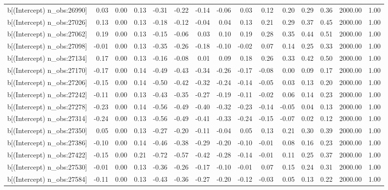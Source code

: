 \begin{table}[ht]
\begin{tabular}{rrrrrrrrrrrrrrr}
  b[(Intercept) n\_obs:26990] & 0.03 & 0.00 & 0.13 & -0.31 & -0.22 & -0.14 & -0.06 & 0.03 & 0.12 & 0.20 & 0.29 & 0.36 & 2000.00 & 1.00 \\ 
  b[(Intercept) n\_obs:27026] & 0.13 & 0.00 & 0.13 & -0.18 & -0.12 & -0.04 & 0.04 & 0.13 & 0.21 & 0.29 & 0.37 & 0.45 & 2000.00 & 1.00 \\ 
  b[(Intercept) n\_obs:27062] & 0.19 & 0.00 & 0.13 & -0.15 & -0.06 & 0.03 & 0.10 & 0.19 & 0.28 & 0.35 & 0.44 & 0.51 & 2000.00 & 1.00 \\ 
  b[(Intercept) n\_obs:27098] & -0.01 & 0.00 & 0.13 & -0.35 & -0.26 & -0.18 & -0.10 & -0.02 & 0.07 & 0.14 & 0.25 & 0.33 & 2000.00 & 1.00 \\ 
  b[(Intercept) n\_obs:27134] & 0.17 & 0.00 & 0.13 & -0.16 & -0.08 & 0.01 & 0.09 & 0.18 & 0.26 & 0.33 & 0.42 & 0.50 & 2000.00 & 1.00 \\ 
  b[(Intercept) n\_obs:27170] & -0.17 & 0.00 & 0.14 & -0.49 & -0.43 & -0.34 & -0.26 & -0.17 & -0.08 & 0.00 & 0.09 & 0.17 & 2000.00 & 1.00 \\ 
  b[(Intercept) n\_obs:27206] & -0.15 & 0.00 & 0.14 & -0.50 & -0.42 & -0.32 & -0.24 & -0.14 & -0.05 & 0.03 & 0.13 & 0.20 & 2000.00 & 1.00 \\ 
  b[(Intercept) n\_obs:27242] & -0.11 & 0.00 & 0.13 & -0.43 & -0.35 & -0.27 & -0.19 & -0.11 & -0.02 & 0.06 & 0.14 & 0.23 & 2000.00 & 1.00 \\ 
  b[(Intercept) n\_obs:27278] & -0.23 & 0.00 & 0.14 & -0.56 & -0.49 & -0.40 & -0.32 & -0.23 & -0.14 & -0.05 & 0.04 & 0.13 & 2000.00 & 1.00 \\ 
  b[(Intercept) n\_obs:27314] & -0.24 & 0.00 & 0.13 & -0.56 & -0.49 & -0.41 & -0.33 & -0.24 & -0.15 & -0.07 & 0.02 & 0.12 & 2000.00 & 1.00 \\ 
  b[(Intercept) n\_obs:27350] & 0.05 & 0.00 & 0.13 & -0.27 & -0.20 & -0.11 & -0.04 & 0.05 & 0.13 & 0.21 & 0.30 & 0.39 & 2000.00 & 1.00 \\ 
  b[(Intercept) n\_obs:27386] & -0.10 & 0.00 & 0.14 & -0.46 & -0.38 & -0.29 & -0.20 & -0.10 & -0.01 & 0.08 & 0.16 & 0.23 & 2000.00 & 1.00 \\ 
  b[(Intercept) n\_obs:27422] & -0.15 & 0.00 & 0.21 & -0.72 & -0.57 & -0.42 & -0.28 & -0.14 & -0.01 & 0.11 & 0.25 & 0.37 & 2000.00 & 1.00 \\ 
  b[(Intercept) n\_obs:27530] & -0.01 & 0.00 & 0.13 & -0.36 & -0.26 & -0.17 & -0.10 & -0.01 & 0.07 & 0.15 & 0.24 & 0.31 & 2000.00 & 1.00 \\ 
  b[(Intercept) n\_obs:27584] & -0.11 & 0.00 & 0.13 & -0.43 & -0.36 & -0.27 & -0.20 & -0.12 & -0.03 & 0.05 & 0.13 & 0.22 & 2000.00 & 1.00 \\ 

\end{tabular}
\end{table}
